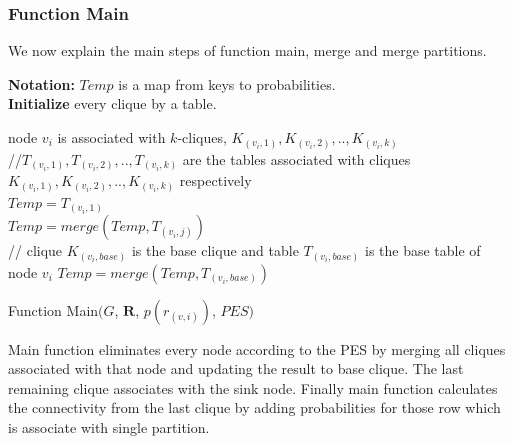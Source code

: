 \documentclass[12pt]{article}
\begin{document}
\subsubsection{Function Main}
\label{subsub:Main}
We now explain the main steps of function main, merge and merge partitions.
\begin{algorithm} [h]
\Indm
{}
\textbf {Notation:} $Temp$ is a map from keys to probabilities.\\
\Indp
\nl \textbf{Initialize } every clique by  a table.\\
\nl{}
{
 \nl node $v_i$ is associated with $k$-cliques, $K_{(v_i,1)},K_{(v_i,2)},..,K_{(v_i,k)}$ \\
 //$T_{(v_i,1)},T_{(v_i,2)},..,T_{(v_i,k)}$ are the tables associated with cliques $K_{(v_i,1)},K_{(v_i,2)},..,K_{(v_i,k)}$ respectively \\
\nl $ Temp=T_{(v_i,1)}$  \\
 \nl {}
 {
  \nl $Temp=merge(Temp,T_{(v_i,j)})$\\
 }
 // clique $K_{(v_i,base)}$ is the base clique and table $T_{(v_i,base)}$ is the base table of node $v_i$
  \nl $Temp=merge(Temp,T_{(v_i,base)})$\\
\nl  {}

\nl {}
}

\nl {}
\caption{Function Main$(G$, $\textbf{R}$, $p(r_{(v,i)})$, $PES )$}
\end{algorithm}



Main function eliminates every node according to the PES by merging all cliques associated with that node and updating the result to base clique. The last remaining clique associates with the sink node. Finally  main function calculates the connectivity from the last clique by adding probabilities for those row which is associate with single partition.
\end{document}
